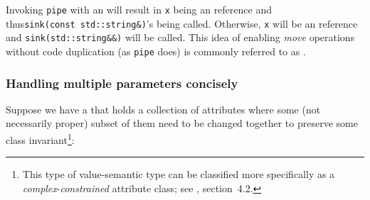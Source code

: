 \noindent Invoking \lstinline!pipe! with an  will result in \lstinline!x!
being an  reference and thus\linebreak[4]%
\mbox{\lstinline!sink(const!~\lstinline!std::string&)!'s} being called. Otherwise,
\lstinline!x! will be an  reference and
\lstinline!sink(std::string&&)! will be called. This idea of enabling
\emph{move} operations without code duplication (as \lstinline!pipe! does)
is commonly referred to as .

\subsubsection[Handling multiple parameters concisely]{Handling multiple parameters concisely}\label{handling-multiple-parameters-concisely}

Suppose we have a  that holds a
collection of attributes where some (not necessarily proper) subset of
them need to be changed together to preserve some class invariant{\cprotect\footnote{This type of
value-semantic type can be classified more specifically as a
\emph{complex}-\emph{constrained} attribute class; see \cite{lakos2a}, section~4.2.}}:


